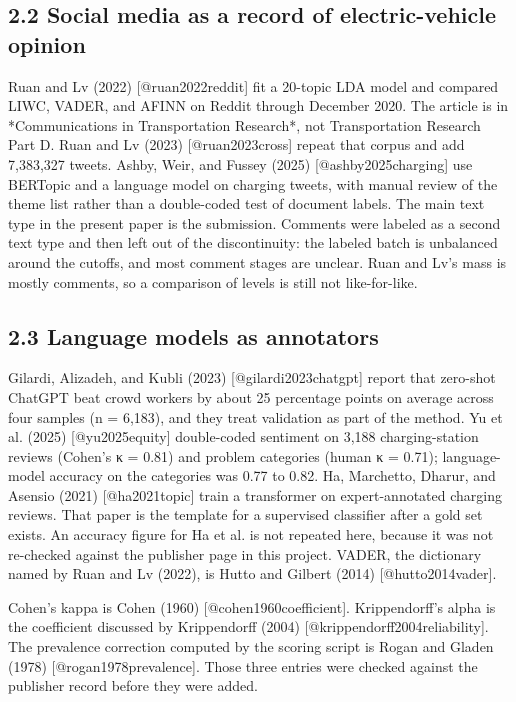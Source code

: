 \documentclass[11pt]{article}
\begin{document}
\subsection{2.2 Social media as a record of electric-vehicle opinion}

Ruan and Lv (2022) [@ruan2022reddit] fit a 20-topic LDA model and compared LIWC, VADER, and AFINN on Reddit through December 2020. The article is in *Communications in Transportation Research*, not Transportation Research Part D. Ruan and Lv (2023) [@ruan2023cross] repeat that corpus and add 7,383,327 tweets. Ashby, Weir, and Fussey (2025) [@ashby2025charging] use BERTopic and a language model on charging tweets, with manual review of the theme list rather than a double-coded test of document labels. The main text type in the present paper is the submission. Comments were labeled as a second text type and then left out of the discontinuity: the labeled batch is unbalanced around the cutoffs, and most comment stages are unclear. Ruan and Lv's mass is mostly comments, so a comparison of levels is still not like-for-like.


\subsection{2.3 Language models as annotators}

Gilardi, Alizadeh, and Kubli (2023) [@gilardi2023chatgpt] report that zero-shot ChatGPT beat crowd workers by about 25 percentage points on average across four samples (n = 6,183), and they treat validation as part of the method. Yu et al. (2025) [@yu2025equity] double-coded sentiment on 3,188 charging-station reviews (Cohen's κ = 0.81) and problem categories (human κ = 0.71); language-model accuracy on the categories was 0.77 to 0.82. Ha, Marchetto, Dharur, and Asensio (2021) [@ha2021topic] train a transformer on expert-annotated charging reviews. That paper is the template for a supervised classifier after a gold set exists. An accuracy figure for Ha et al. is not repeated here, because it was not re-checked against the publisher page in this project. VADER, the dictionary named by Ruan and Lv (2022), is Hutto and Gilbert (2014) [@hutto2014vader].


Cohen's kappa is Cohen (1960) [@cohen1960coefficient]. Krippendorff's alpha is the coefficient discussed by Krippendorff (2004) [@krippendorff2004reliability]. The prevalence correction computed by the scoring script is Rogan and Gladen (1978) [@rogan1978prevalence]. Those three entries were checked against the publisher record before they were added.
\end{document}
